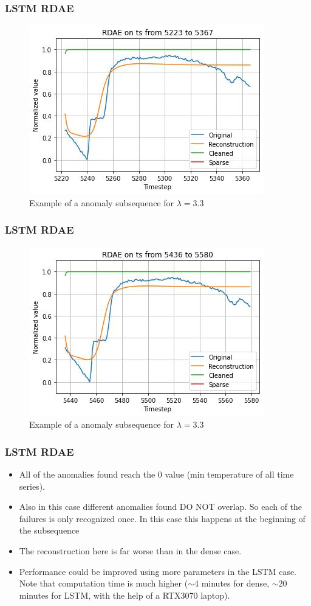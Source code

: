 \documentclass{beamer}
\theoremstyle{plain}
\theoremstyle{definition}
\theoremstyle{remark}
\begin{document}
\begin{frame}
	\frametitle{LSTM RDAE}
	\begin{figure}
		\centering
		\includegraphics[width=0.7\linewidth]{Images/LSTMlam3.3ts_anomalyzoom5223.jpg}
		\caption[]{Example of a anomaly subsequence for $\lambda=3.3$}
	\end{figure}
\end{frame}

\begin{frame}
	\frametitle{LSTM RDAE}
	\begin{figure}
		\centering
		\includegraphics[width=0.7\linewidth]{Images/LSTMlam3.3ts_anomalyzoom5436.jpg}
		\caption[]{Example of a anomaly subsequence for $\lambda=3.3$}
	\end{figure}
\end{frame}

\begin{frame}
	\frametitle{LSTM RDAE}
	\begin{itemize}
		\item All of the anomalies found reach the $0$ value (min temperature of all time series).
		\item Also in this case different anomalies found DO NOT overlap. So each of the failures is only recognized once. In this case this happens at the beginning of the subsequence
		\item The reconstruction here is far worse than in the dense case.
		\item Performance could be improved using more parameters in the LSTM case. Note that computation time is much higher ($\sim 4$ minutes for dense, $\sim 20$ minutes for LSTM, with the help of a RTX3070 laptop).
	\end{itemize}
\end{frame}
\end{document}
